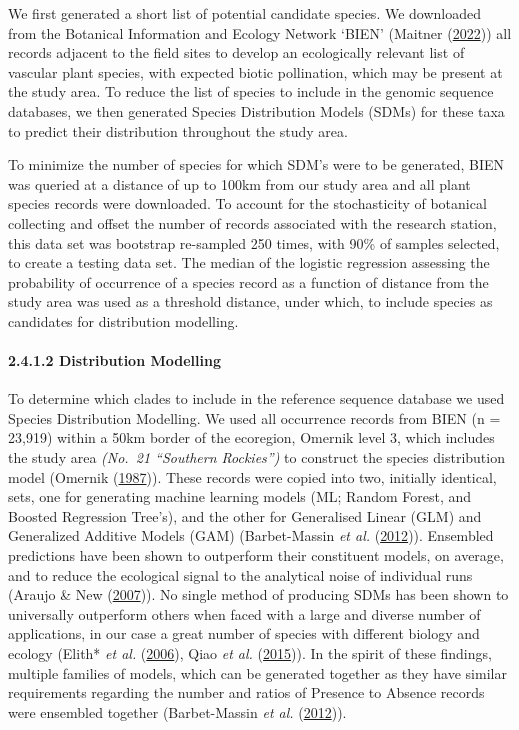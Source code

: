 \documentclass[
]{article}
\begin{document}
We first generated a short list of potential candidate species. We
downloaded from the Botanical Information and Ecology Network `BIEN'
(Maitner (\protect\hyperlink{ref-bien2022}{2022})) all records adjacent
to the field sites to develop an ecologically relevant list of vascular
plant species, with expected biotic pollination, which may be present at
the study area. To reduce the list of species to include in the genomic
sequence databases, we then generated Species Distribution Models (SDMs)
for these taxa to predict their distribution throughout the study area.

To minimize the number of species for which SDM's were to be generated,
BIEN was queried at a distance of up to 100km from our study area and
all plant species records were downloaded. To account for the
stochasticity of botanical collecting and offset the number of records
associated with the research station, this data set was bootstrap
re-sampled 250 times, with 90\% of samples selected, to create a testing
data set. The median of the logistic regression assessing the
probability of occurrence of a species record as a function of distance
from the study area was used as a threshold distance, under which, to
include species as candidates for distribution modelling.

\hypertarget{distribution-modelling}{%
\paragraph{2.4.1.2 Distribution
Modelling}\label{distribution-modelling}}

To determine which clades to include in the reference sequence database
we used Species Distribution Modelling. We used all occurrence records
from BIEN (n = 23,919) within a 50km border of the ecoregion, Omernik
level 3, which includes the study area \emph{(No.~21 ``Southern
Rockies'')} to construct the species distribution model (Omernik
(\protect\hyperlink{ref-omernik1987ecoregions}{1987})). These records
were copied into two, initially identical, sets, one for generating
machine learning models (ML; Random Forest, and Boosted Regression
Tree's), and the other for Generalised Linear (GLM) and Generalized
Additive Models (GAM) (Barbet-Massin \emph{et al.}
(\protect\hyperlink{ref-barbet2012selecting}{2012})). Ensembled
predictions have been shown to outperform their constituent models, on
average, and to reduce the ecological signal to the analytical noise of
individual runs (Araujo \& New
(\protect\hyperlink{ref-araujo2007ensemble}{2007})). No single method of
producing SDMs has been shown to universally outperform others when
faced with a large and diverse number of applications, in our case a
great number of species with different biology and ecology (Elith*
\emph{et al.} (\protect\hyperlink{ref-elith2006novel}{2006}), Qiao
\emph{et al.} (\protect\hyperlink{ref-qiao2015no}{2015})). In the spirit
of these findings, multiple families of models, which can be generated
together as they have similar requirements regarding the number and
ratios of Presence to Absence records were ensembled together
(Barbet-Massin \emph{et al.}
(\protect\hyperlink{ref-barbet2012selecting}{2012})).
\end{document}
